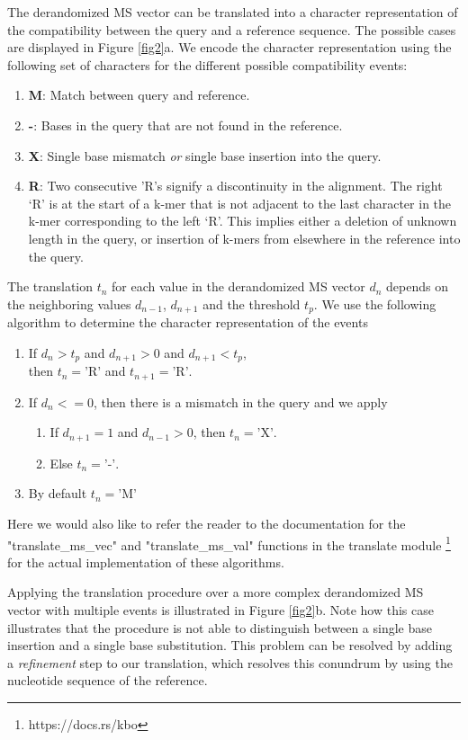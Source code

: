 \documentclass[unnumsec,webpdf,contemporary,large]{oup-authoring-template}%
\theoremstyle{thmstyleone}%
\theoremstyle{thmstyletwo}%
\theoremstyle{thmstylethree}%
\begin{document}
The derandomized MS vector can be translated into a character representation of the compatibility between the query and a reference sequence. The possible cases are displayed in Figure \ref{fig2}a. We encode the character representation using the following set of characters for the different possible compatibility events:
\begin{enumerate}
\item[] \textbf{M}: Match between query and reference.
\item[] \textbf{-}: Bases in the query that are not found in the reference.
\item[] \textbf{X}: Single base mismatch \textit{or} single base insertion into the query.
\item[] \textbf{R}: Two consecutive ’R’s signify a discontinuity in the alignment. The right ‘R’ is at the start of a k-mer that is not adjacent to the last character in the k-mer corresponding to the left ‘R’. This implies either a deletion of unknown length in the query, or insertion of k-mers from elsewhere in the reference into the query.
\end{enumerate}

The translation $t_n$ for each value in the derandomized MS vector $d_n$ depends on the neighboring values $d_{n - 1}$, $d_{n + 1}$ and the threshold $t_p$. We use the following algorithm to determine the character representation of the events
\begin{enumerate}
\item If $d_n > t_p$ and $d_{n + 1} > 0$ and $d_{n + 1} < t_p$, \\ then $t_n = \text{'R'}$ and $t_{n + 1} = \text{'R'}$.
\item If $d_n <= 0$, then there is a mismatch in the query and we apply
    \begin{enumerate}
    \item If $d_{n + 1} = 1$ and $d_{n - 1} > 0$, then $t_n = \text{'X'}$.
    \item Else $t_n = \text{'-'}$.
    \end{enumerate}
\item By default $t_n = \text{'M'}$
\end{enumerate}
Here we would also like to refer the reader to the documentation for the "translate\_ms\_vec" and "translate\_ms\_val" functions in the translate module \footnote{https://docs.rs/kbo} for the actual implementation of these algorithms.

Applying the translation procedure over a more complex derandomized MS vector with multiple events is illustrated in Figure \ref{fig2}b. Note how this case illustrates that the procedure is not able to distinguish between a single base insertion and a single base substitution. This problem can be resolved by adding a \textit{refinement} step to our translation, which resolves this conundrum by using the nucleotide sequence of the reference.
\end{document}
